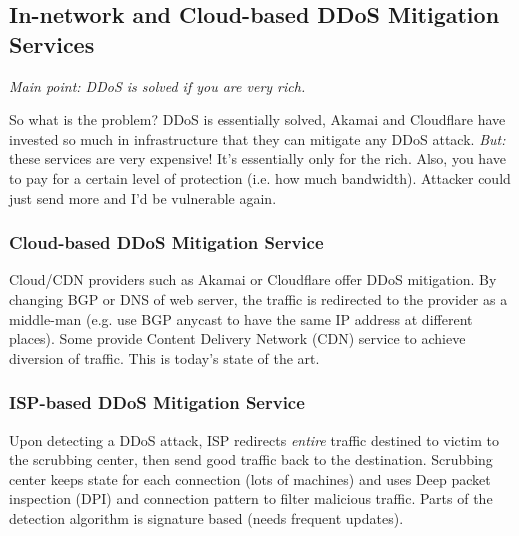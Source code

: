 \documentclass[11pt,oneside,a4paper]{article}
\begin{document}
\subsection{In-network and Cloud-based DDoS	Mitigation Services}

\textit{Main point: DDoS is solved if you are very rich.}

\noindent So what is the problem? DDoS is essentially solved, Akamai and Cloudflare have invested so much in infrastructure that they can mitigate any DDoS attack. \textit{But:} these services are very expensive! It's essentially only for the rich. Also, you have to pay for a certain level of protection (i.e. how much bandwidth). Attacker could just send more and I'd be vulnerable again.

\subsubsection{Cloud-based DDoS Mitigation Service}

Cloud/CDN providers such as Akamai or Cloudflare offer DDoS mitigation. By changing BGP or DNS of web server, the traffic is redirected to the provider as a middle-man (e.g. use BGP anycast to have the same IP address at different places). Some provide Content Delivery Network (CDN) service to achieve diversion of traffic. This is today's state of the art.

\subsubsection{ISP-based DDoS Mitigation Service}

Upon detecting a DDoS attack, ISP redirects \textit{entire} traffic destined to victim to the scrubbing center, then send good traffic back to the destination. Scrubbing center keeps state for each connection (lots of machines) and uses Deep packet inspection (DPI) and connection pattern to filter malicious traffic. Parts of the detection algorithm is signature based (needs frequent updates).
\end{document}
